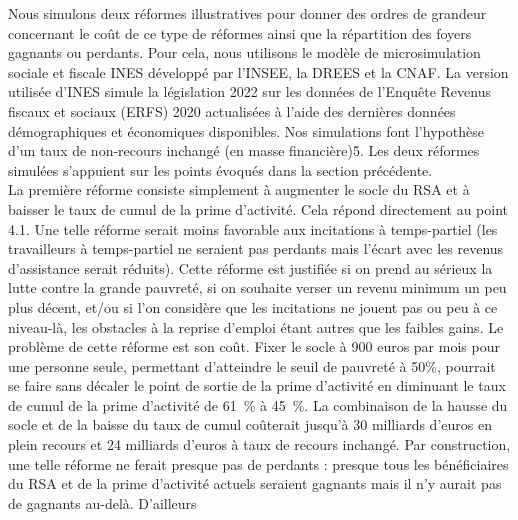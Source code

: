 \documentclass[
  french,
]{article}
\newcounter{quartocallouttipno}
\newcommand{\quartocallouttip}[1]{\refstepcounter{quartocallouttipno}\label{#1}}
\begin{document}
\begin{tcolorbox}[enhanced jigsaw, arc=.35mm, bottomrule=.15mm, bottomtitle=1mm, breakable, colback=white, colbacktitle=quarto-callout-tip-color!10!white, colframe=quarto-callout-tip-color-frame, coltitle=black, left=2mm, leftrule=.75mm, opacityback=0, opacitybacktitle=0.6, rightrule=.15mm, title={Astuce \ref*{tip-simul}. Simulation de deux réformes}, titlerule=0mm, toprule=.15mm, toptitle=1mm]

\quartocallouttip{tip-simul} 

Nous simulons deux réformes illustratives pour donner des ordres de
grandeur concernant le coût de ce type de réformes ainsi que la
répartition des foyers gagnants ou perdants. Pour cela, nous utilisons
le modèle de microsimulation sociale et fiscale INES développé par
l'INSEE, la DREES et la CNAF. La version utilisée d'INES simule la
législation 2022 sur les données de l'Enquête Revenus fiscaux et sociaux
(ERFS) 2020 actualisées à l'aide des dernières données démographiques et
économiques disponibles. Nos simulations font l'hypothèse d'un taux de
non-recours inchangé (en masse financière)5. Les deux réformes simulées
s'appuient sur les points évoqués dans la section précédente.\\
La première réforme consiste simplement à augmenter le socle du RSA et à
baisser le taux de cumul de la prime d'activité. Cela répond directement
au point 4.1. Une telle réforme serait moins favorable aux incitations à
temps-partiel (les travailleurs à temps-partiel ne seraient pas perdants
mais l'écart avec les revenus d'assistance serait réduits). Cette
réforme est justifiée si on prend au sérieux la lutte contre la grande
pauvreté, si on souhaite verser un revenu minimum un peu plus décent,
et/ou si l'on considère que les incitations ne jouent pas ou peu à ce
niveau-là, les obstacles à la reprise d'emploi étant autres que les
faibles gains. Le problème de cette réforme est son coût. Fixer le socle
à 900 euros par mois pour une personne seule, permettant d'atteindre le
seuil de pauvreté à 50\%, pourrait se faire sans décaler le point de
sortie de la prime d'activité en diminuant le taux de cumul de la prime
d'activité de 61~\% à 45~\%. La combinaison de la hausse du socle et de
la baisse du taux de cumul coûterait jusqu'à 30 milliards d'euros en
plein recours et 24 milliards d'euros à taux de recours inchangé. Par
construction, une telle réforme ne ferait presque pas de perdants :
presque tous les bénéficiaires du RSA et de la prime d'activité actuels
seraient gagnants mais il n'y aurait pas de gagnants au-delà. D'ailleurs

\end{tcolorbox}
\end{document}
